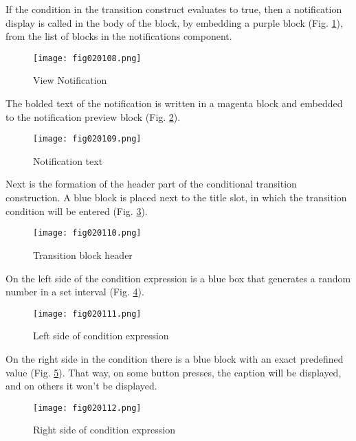 If the condition in the transition construct evaluates to true, then a notification display is called in the body of the block, by embedding a purple block (Fig. \ref{fig020108}), from the list of blocks in the notifications component.

\begin{figure}[H]
   \centering
   \texttt{[image: fig020108.png]}
   \caption{View Notification}
\label{fig020108}
\end{figure}

The bolded text of the notification is written in a magenta block and embedded to the notification preview block (Fig. \ref{fig020109}).

\begin{figure}[H]
   \centering
   \texttt{[image: fig020109.png]}
   \caption{Notification text}
\label{fig020109}
\end{figure}

Next is the formation of the header part of the conditional transition construction. A blue block is placed next to the title slot, in which the transition condition will be entered (Fig. \ref{fig020110}).

\begin{figure}[H]
   \centering
   \texttt{[image: fig020110.png]}
   \caption{Transition block header}
\label{fig020110}
\end{figure}

On the left side of the condition expression is a blue box that generates a random number in a set interval (Fig. \ref{fig020111}).

\begin{figure}[H]
   \centering
   \texttt{[image: fig020111.png]}
   \caption{Left side of condition expression}
\label{fig020111}
\end{figure}

On the right side in the condition there is a blue block with an exact predefined value (Fig. \ref{fig020112}). That way, on some button presses, the caption will be displayed, and on others it won't be displayed.

\begin{figure}[H]
   \centering
   \texttt{[image: fig020112.png]}
   \caption{Right side of condition expression}
\label{fig020112}
\end{figure}

